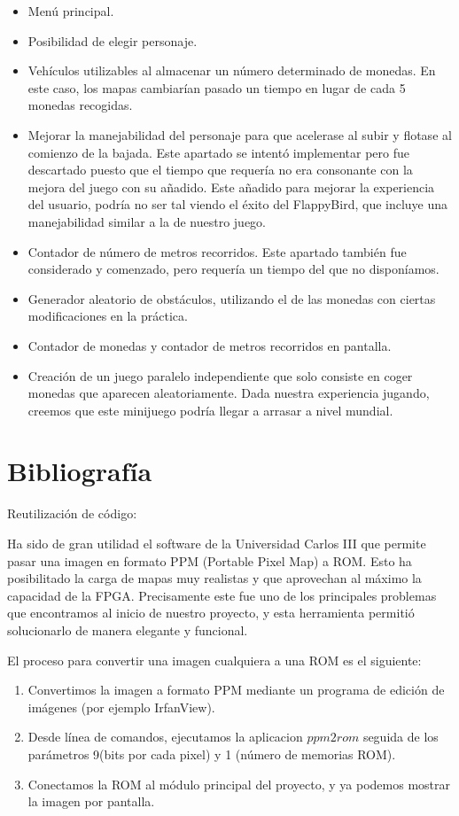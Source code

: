 \documentclass[11pt, a4paper, spanish, openright, twoside]{book}
\begin{document}
\begin{itemize}
	\item Menú principal.
	\item Posibilidad de elegir personaje.
	\item Vehículos utilizables al almacenar un número determinado de monedas. En este caso, los mapas cambiarían pasado un tiempo en lugar de cada 5 monedas recogidas.
	\item Mejorar la  manejabilidad del personaje para que acelerase al subir y flotase al comienzo de la bajada. 
	Este apartado se intentó implementar pero fue descartado puesto que el tiempo que requería no era consonante con la mejora del juego con su añadido.
	Este añadido  para mejorar la experiencia del usuario, podría no ser tal viendo el éxito del FlappyBird, que incluye una manejabilidad similar a la de nuestro juego.
	\item Contador de número de metros recorridos. Este apartado también fue considerado y comenzado, pero requería un tiempo del que no disponíamos.
	\item Generador aleatorio de obstáculos, utilizando el de las monedas con ciertas modificaciones en la práctica.
	\item Contador de monedas y contador de metros recorridos en pantalla.
	\item Creación de un juego paralelo independiente que solo consiste en coger monedas que aparecen aleatoriamente. Dada nuestra experiencia jugando, creemos que este minijuego podría llegar a arrasar a nivel mundial.
\end{itemize}


\section{Bibliografía}
Reutilización de código:

Ha sido de gran utilidad el software de la Universidad Carlos III que permite pasar una imagen en formato PPM (Portable Pixel Map) a ROM. Esto ha posibilitado la carga de mapas muy realistas y que aprovechan al máximo la capacidad de la FPGA.
Precisamente este fue uno de los principales problemas que encontramos al inicio de nuestro proyecto, y esta herramienta permitió solucionarlo de manera elegante y funcional. 

El proceso para convertir una imagen cualquiera a una ROM es el siguiente:
\begin{enumerate}
\item Convertimos la imagen a formato PPM mediante un programa de edición de imágenes (por ejemplo IrfanView).
\item Desde línea de comandos, ejecutamos la aplicacion $ppm2rom$ seguida de los parámetros 9(bits por cada pixel) y 1 (número de memorias ROM).
\item Conectamos la ROM al módulo principal del proyecto, y ya podemos mostrar la imagen por pantalla.
\end{enumerate}
\end{document}
